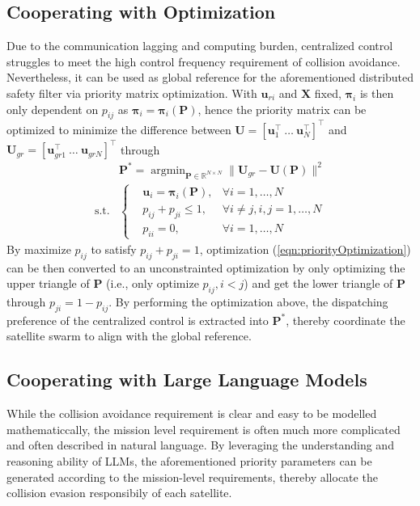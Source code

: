 \documentclass{ifacconf}
\begin{document}
\subsection{Cooperating with Optimization}
\par Due to the communication lagging and computing burden, centralized control struggles to meet the high control frequency requirement of collision avoidance.
Nevertheless, it can be used as global reference for the aforementioned distributed safety filter via priority matrix optimization. 
With $\boldsymbol{u}_{ri}$ and $\boldsymbol{X}$ fixed, $\boldsymbol{\pi}_i$ is then only dependent on $p_{ij}$ as $\boldsymbol{\pi}_i = \boldsymbol{\pi}_i (\boldsymbol{P})$, hence the priority matrix can be optimized to minimize the difference between $\boldsymbol{U} = [\boldsymbol{u}_1^\top~\dots~\boldsymbol{u}_N^\top]^\top$ and $\boldsymbol{U}_{gr} = [\boldsymbol{u}_{gr1}^{\top}~\dots~\boldsymbol{u}_{grN}]^\top$ through
\begin{equation}\label{eqn:priorityOptimization}
\begin{aligned}
      & \boldsymbol{P}^{\ast} = \mathop{\arg \min}_{\boldsymbol{P} \in \mathbb{R}^{N\times N}} \| \boldsymbol{U}_{gr} - \boldsymbol{U}(\boldsymbol{P}) \|^2 \\
      \mathrm{s.t.}& \left\{ 
         \begin{aligned}
            &\boldsymbol{u}_i =  \boldsymbol{\pi}_i(\boldsymbol{P}), &\forall i = 1, \dots, N\\
            &p_{ij} + p_{ji} \le 1, &\forall i \neq j, i, j = 1, \dots, N\\
            &p_{ii} = 0, &\forall i = 1, \dots, N
         \end{aligned}   
      \right.
\end{aligned}
\end{equation}
By maximize $p_{ij}$ to satisfy $p_{ij} + p_{ji} = 1$, optimization (\ref{eqn:priorityOptimization}) can be then converted to an unconstrainted optimization by only optimizing the upper triangle of $\boldsymbol{P}$ (i.e., only optimize $p_{ij}, i < j$) and get the lower triangle of $\boldsymbol{P}$ through $p_{ji} = 1 - p_{ij}$.
By performing the optimization above, the dispatching preference of the centralized control is extracted into $\boldsymbol{P}^\ast$, thereby coordinate the satellite swarm to align with the global reference.

\subsection{Cooperating with Large Language Models}
\par While the collision avoidance requirement is clear and easy to be modelled mathematiccally, the mission level requirement is often much more complicated and often described in natural language. 
By leveraging the understanding and reasoning ability of LLMs, the aforementioned priority parameters can be generated according to the mission-level requirements, thereby allocate the collision evasion responsibily of each satellite.
\end{document}
